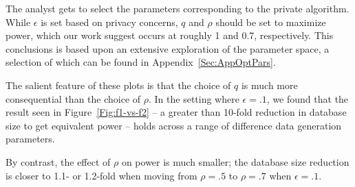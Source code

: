 The analyst gets to select the parameters corresponding to the private algorithm. While
$\epsilon$ is set based on privacy concerns, $q$ and $\rho$ should be set to 
maximize power, which our work suggest occurs at roughly 1 and 0.7, respectively.
This conclusions is based upon an extensive exploration of the parameter space, 
a selection of which can be found in Appendix~\ref{Sec:AppOptPars}.

The salient feature of these plots is that the choice of $q$ is much more 
consequential than the choice of $\rho$. In the setting where $\epsilon = .1$, 
we found that the result seen in Figure~\ref{Fig:f1-vs-f2} -- a greater than 
10-fold reduction in database size to get equivalent power -- holds across a range
of difference data generation parameters.

By contrast, the effect of $\rho$ on power is much smaller; the database size
reduction is closer to 1.1- or 1.2-fold when moving from $\rho = .5$ to $\rho = .7$
when $\epsilon = .1$.

